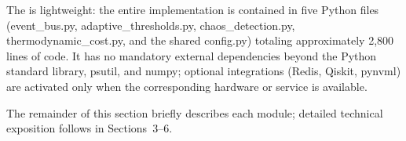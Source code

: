 

The \Core{} is lightweight: the entire implementation is contained in five
Python files (event\_bus.py, adaptive\_thresholds.py, chaos\_detection.py,
thermodynamic\_cost.py, and the shared config.py) totaling approximately 
2,800 lines of code.  It has no mandatory external dependencies beyond the
Python standard library, psutil, and numpy; optional integrations (Redis,
Qiskit, pynvml) are activated only when the corresponding hardware or service
is available.

The remainder of this section briefly describes each module; detailed
technical exposition follows in Sections~3--6.